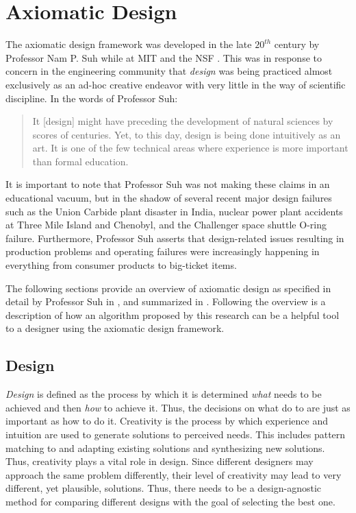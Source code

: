 \section{Axiomatic Design}

The axiomatic design framework was developed in the late \(20^{th}\) century by Professor Nam P. Suh while at MIT
and the NSF \cite{suh}.  This was in response to concern in the engineering community that \emph{design} was being
practiced almost exclusively as an ad-hoc creative endeavor with very little in the way of scientific discipline.
In the words of Professor Suh:
\begin{quote}
  It [design] might have preceding the development of natural sciences by scores of centuries.  Yet, to this day,
  design is being done intuitively as an art.  It is one of the few technical areas where experience is more
  important than formal education.
\end{quote}
It is important to note that Professor Suh was not making these claims in an educational vacuum, but in the shadow
of several recent major design failures such as the Union Carbide plant disaster in India, nuclear power plant
accidents at Three Mile Island and Chenobyl, and the Challenger space shuttle O-ring failure.  Furthermore,
Professor Suh asserts that design-related issues resulting in production problems and operating failures were
increasingly happening in everything from consumer products to big-ticket items.

The following sections provide an overview of axiomatic design as specified in detail by Professor Suh in
\cite{suh}, and summarized in \cite{cavallaro,jahanbekam,suh2}.  Following the overview is a description of how an
algorithm proposed by this research can be a helpful tool to a designer using the axiomatic design framework.

\subsection{Design}

\emph{Design} is defined as the process by which it is determined \emph{what} needs to be achieved and then
\emph{how} to achieve it.  Thus, the decisions on what do to are just as important as how to do it.  Creativity is
the process by which experience and intuition are used to generate solutions to perceived needs.  This includes
pattern matching to and adapting existing solutions and synthesizing new solutions.  Thus, creativity plays a vital
role in design.  Since different designers may approach the same problem differently, their level of creativity may
lead to very different, yet plausible, solutions.  Thus, there needs to be a design-agnostic method for comparing
different designs with the goal of selecting the best one.

